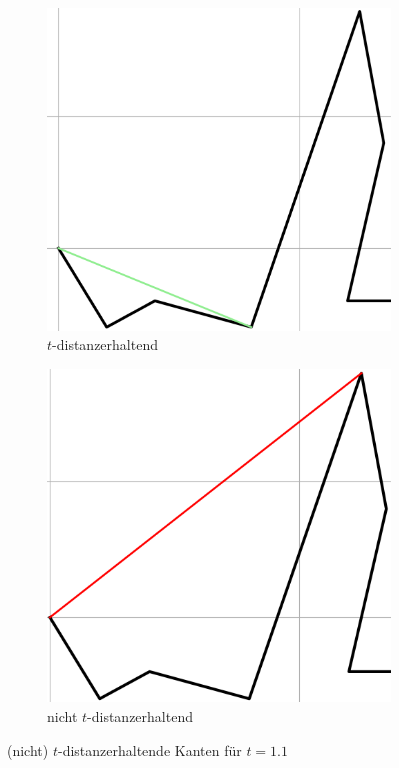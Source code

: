 \documentclass{beamer}
\begin{document}
	\begin{frame}
		\begin{figure}
			\centering
			\begin{subfigure}{.5\textwidth}
				\centering
				\includegraphics[width=.75\linewidth]{t_distance_preserving_edge.png}
				\caption{$t$-distanzerhaltend}

			\end{subfigure}%
			\begin{subfigure}{.5\textwidth}
				\centering
				\includegraphics[width=.75\linewidth]{not_t_distance_preserving_edge.png}
				\caption{nicht $t$-distanzerhaltend}
			\end{subfigure}
			\caption{ (nicht) $t$-distanzerhaltende Kanten für $t = 1.1$}
		\end{figure}
	\end{frame}
	
\end{document}
